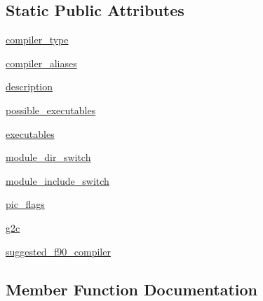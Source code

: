 \subsection*{Static Public Attributes}
\begin{DoxyCompactItemize}
\item 
\hyperlink{classnumpy_1_1distutils_1_1fcompiler_1_1gnu_1_1GnuFCompiler_af9e3025e8c7dc14a01ced5feeb412d0b}{compiler\+\_\+type}
\item 
\hyperlink{classnumpy_1_1distutils_1_1fcompiler_1_1gnu_1_1GnuFCompiler_af1a5a41577ebb3dc8986bf101f125c06}{compiler\+\_\+aliases}
\item 
\hyperlink{classnumpy_1_1distutils_1_1fcompiler_1_1gnu_1_1GnuFCompiler_a75f9b71b13e473c7a180d8a421833e4b}{description}
\item 
\hyperlink{classnumpy_1_1distutils_1_1fcompiler_1_1gnu_1_1GnuFCompiler_a75355f18945130974209369e41d96273}{possible\+\_\+executables}
\item 
\hyperlink{classnumpy_1_1distutils_1_1fcompiler_1_1gnu_1_1GnuFCompiler_accdad7ec7ae6c50ba01fee1f21c08f13}{executables}
\item 
\hyperlink{classnumpy_1_1distutils_1_1fcompiler_1_1gnu_1_1GnuFCompiler_a7ea73c3da7838a4e713bff2aa63422d7}{module\+\_\+dir\+\_\+switch}
\item 
\hyperlink{classnumpy_1_1distutils_1_1fcompiler_1_1gnu_1_1GnuFCompiler_abd97307bff47622190b3b0b01243ead0}{module\+\_\+include\+\_\+switch}
\item 
\hyperlink{classnumpy_1_1distutils_1_1fcompiler_1_1gnu_1_1GnuFCompiler_aad5e81110a853fca5972564c066409d9}{pic\+\_\+flags}
\item 
\hyperlink{classnumpy_1_1distutils_1_1fcompiler_1_1gnu_1_1GnuFCompiler_a5d7b3182c1ed651275109644f75fa6f0}{g2c}
\item 
\hyperlink{classnumpy_1_1distutils_1_1fcompiler_1_1gnu_1_1GnuFCompiler_a1ea8d763f73bcf0b78878aae2d2ad303}{suggested\+\_\+f90\+\_\+compiler}
\end{DoxyCompactItemize}


\subsection{Member Function Documentation}
\mbox{\label{classnumpy_1_1distutils_1_1fcompiler_1_1gnu_1_1GnuFCompiler_ac9e5bcbad4034c7183dc77292aab6433}} 
